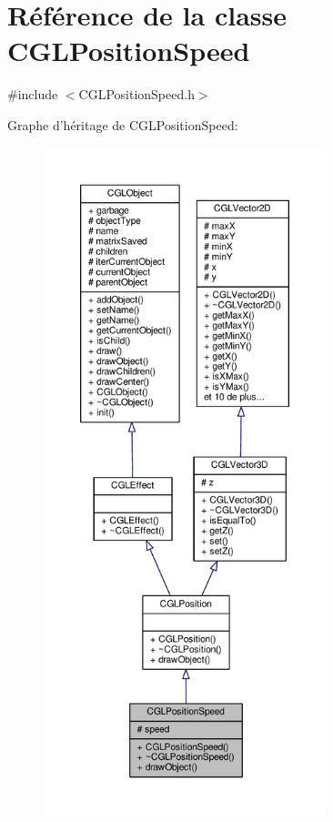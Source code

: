 \hypertarget{class_c_g_l_position_speed}{\section{Référence de la classe C\-G\-L\-Position\-Speed}
\label{class_c_g_l_position_speed}
}


{\ttfamily \#include $<$C\-G\-L\-Position\-Speed.\-h$>$}



Graphe d'héritage de C\-G\-L\-Position\-Speed\-:
\nopagebreak
\begin{figure}[H]
\begin{center}
\leavevmode
\includegraphics[height=550pt]{dc/d1b/class_c_g_l_position_speed__inherit__graph}
\end{center}
\end{figure}


